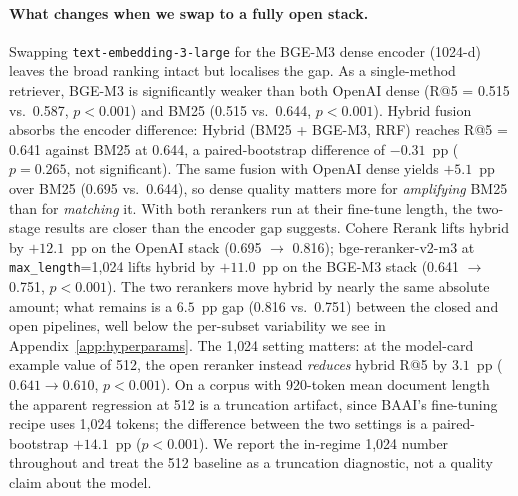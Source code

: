 \documentclass{article}
\begin{document}
\paragraph{What changes when we swap to a fully open stack.}
Swapping \texttt{text-embedding-3-large} for the BGE-M3 dense encoder (1024-d) leaves the broad ranking intact but localises the gap. As a single-method retriever, BGE-M3 is significantly weaker than both OpenAI dense (R@5 = 0.515 vs.\ 0.587, $p<0.001$) and BM25 (0.515 vs.\ 0.644, $p<0.001$). Hybrid fusion absorbs the encoder difference: Hybrid (BM25 + BGE-M3, RRF) reaches R@5 = 0.641 against BM25 at 0.644, a paired-bootstrap difference of $-0.31$~pp ($p=0.265$, not significant). The same fusion with OpenAI dense yields $+5.1$~pp over BM25 (0.695 vs.\ 0.644), so dense quality matters more for \emph{amplifying} BM25 than for \emph{matching} it. With both rerankers run at their fine-tune length, the two-stage results are closer than the encoder gap suggests. Cohere Rerank lifts hybrid by $+12.1$~pp on the OpenAI stack (0.695 $\to$ 0.816); bge-reranker-v2-m3 at \texttt{max\_length}=1{,}024 lifts hybrid by $+11.0$~pp on the BGE-M3 stack (0.641 $\to$ 0.751, $p<0.001$). The two rerankers move hybrid by nearly the same absolute amount; what remains is a $6.5$~pp gap (0.816 vs.\ 0.751) between the closed and open pipelines, well below the per-subset variability we see in Appendix~\ref{app:hyperparams}. The 1{,}024 setting matters: at the model-card example value of 512, the open reranker instead \emph{reduces} hybrid R@5 by $3.1$~pp ($0.641 \to 0.610$, $p<0.001$). On a corpus with 920-token mean document length the apparent regression at 512 is a truncation artifact, since BAAI's fine-tuning recipe uses 1{,}024 tokens; the difference between the two settings is a paired-bootstrap $+14.1$~pp ($p<0.001$). We report the in-regime 1{,}024 number throughout and treat the 512 baseline as a truncation diagnostic, not a quality claim about the model.
\end{document}
